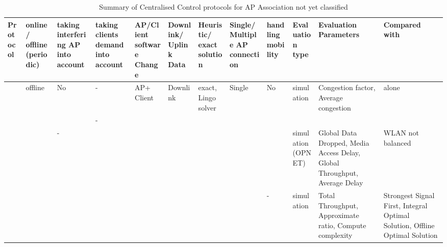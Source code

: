 \documentclass[journal,transmag]{IEEEtran}
\begin{document}
\begin{table}
\centering\caption{Summary of Centralised Control protocols for AP Association not yet classified \label{Tab:centralised_QOS_load_balancing1}}
\begin{tabular} {|p{}|p{.9cm}|p{.9cm}|p{.6cm}|p{.95cm}|p{1.1cm}|p{.6cm}|p{}|p{}|p{} |p{2.3cm}|p{}|}
\hline
\cellcolor{xy}\scriptsize{Protocol} & \cellcolor{xy}\scriptsize{online/ offline (periodic)} & \cellcolor{xy}\scriptsize{taking interfering AP into account} & \cellcolor{xy}\scriptsize{taking clients demand into account} & \cellcolor{xy}\scriptsize{AP/Client software Change} & \cellcolor{xy} \scriptsize{Downlink/ Uplink Data} & \cellcolor{xy} \scriptsize{Heuristic/ exact solution} & \cellcolor{xy} \scriptsize{Single/Multiple AP connection} & \cellcolor{xy} \scriptsize{handling mobility} & \cellcolor{xy}\scriptsize{Evaluation type} & \cellcolor{xy}\scriptsize{Evaluation Parameters} & \cellcolor{xy}\scriptsize{Compared with} \\\hline\hline

\scriptsize{\cite{05optimal_AP_selection}} &\scriptsize{offline} &\scriptsize{No} &\scriptsize{-} &\scriptsize{AP+ Client} &\scriptsize{Downlink} &\scriptsize{exact, Lingo solver} &\scriptsize{Single} &\scriptsize{No} &\scriptsize{simulation} &\scriptsize{Congestion factor, Average congestion} &\scriptsize{alone}\\\hline

\scriptsize{\cite{05optimal_association_stations}} &\scriptsize{} &\scriptsize{} &\scriptsize{-} &\scriptsize{} &\scriptsize{} &\scriptsize{} &\scriptsize{} &\scriptsize{} &\scriptsize{} &\scriptsize{} &\scriptsize{}\\\hline

\scriptsize{\cite{08load_balancing_QOS} } &\scriptsize{} &\scriptsize{-} &\scriptsize{} &\scriptsize{} &\scriptsize{} &\scriptsize{} &\scriptsize{} &\scriptsize{} &\scriptsize{simulation (OPNET)} &\scriptsize{Global Data Dropped, Media Access Delay, Global Throughput, Average Delay} &\scriptsize{WLAN not balanced}\\\hline

\scriptsize{\cite{09achieving_effeciency_fairness_vehicular} } &\scriptsize{} &\scriptsize{} &\scriptsize{} &\scriptsize{} &\scriptsize{} &\scriptsize{} &\scriptsize{} &\scriptsize{-} &\scriptsize{simulation} &\scriptsize{Total Throughput, Approximate ratio, Compute complexity} &\scriptsize{Strongest Signal First, Integral Optimal Solution, Offline Optimal Solution}\\\hline


\end{tabular}
\end{table}
\end{document}

